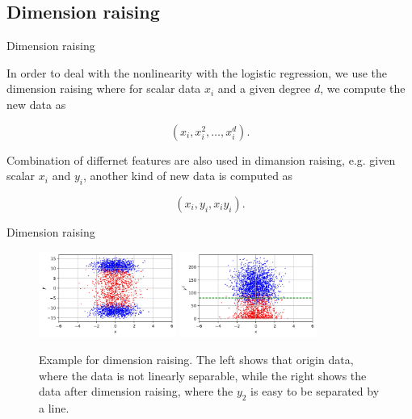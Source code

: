 \documentclass{beamer}
\begin{document}
\subsection{Dimension raising}

\begin{frame}{Dimension raising}

  In order to deal with the nonlinearity with the logistic regression, we use the dimension raising where for scalar data $x_i$ and a given degree $d$, we compute the new data as \vspace{.25cm}

  $$
    (x_i, x_i^2, \dots, x_i^d).
  $$ \vspace{.25cm}

  Combination of differnet features are also used in dimansion raising, e.g. given scalar $x_i$ and $y_i$, another kind of new data is computed as \vspace{.25cm}

  $$
    (x_i, y_i, x_i y_i).
  $$ \vspace{.25cm}

\end{frame}

\begin{frame}{Dimension raising}

  \begin{figure}[H]
    \centering
    \includegraphics[width=0.4\textwidth]{./figure/Sample-Raising-1.jpg}
    \includegraphics[width=0.4\textwidth]{./figure/Sample-Raising-2.jpg}
    \caption{Example for dimension raising. The left shows that origin data, where the data is not linearly separable, while the right shows the data after dimension raising, where the $y_2$ is easy to be separated by a line.}
  \end{figure}

\end{frame}
\end{document}
